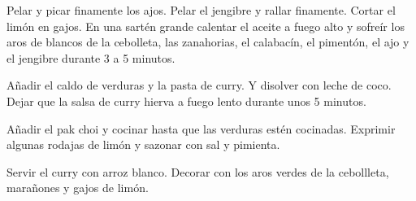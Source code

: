 \begin{recipe}
{        \step Pelar y picar finamente los ajos.
        Pelar el jengibre y rallar finamente.
        Cortar el lim\'on en gajos.
        En una sart\'en grande calentar el aceite a fuego alto y sofre\'ir los aros de blancos de la cebolleta, las zanahorias, el calabac\'in, el piment\'on, el ajo y el jengibre durante 3 a 5 minutos. 
        
        \step A\~nadir el caldo de verduras y la pasta de curry. Y disolver con leche de coco. Dejar que la salsa de curry hierva a fuego lento durante unos 5 minutos.
        
        \step A\~nadir el pak choi y cocinar hasta que las verduras est\'en cocinadas. Exprimir algunas rodajas de lim\'on y sazonar con sal y pimienta.  
        
        \step Servir el curry con arroz blanco. Decorar con los aros verdes de la cebollleta, mara\~nones y gajos de lim\'on.  
    }
    
    
    
    \hint{%

    }
    
\end{recipe}